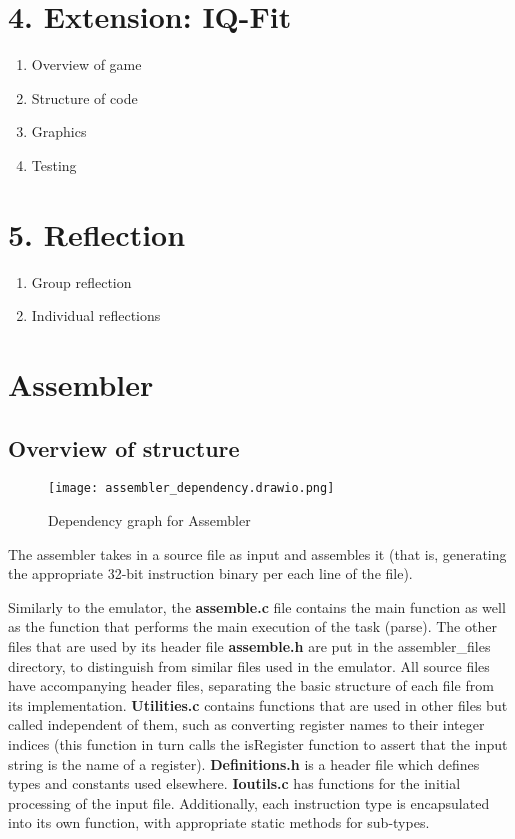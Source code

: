 \documentclass{article}
\begin{document}
\section*{4. Extension: IQ-Fit} 
\begin{enumerate}
    \item Overview of game
    \item Structure of code
    \item Graphics
    \item Testing
\end{enumerate}

\section*{5. Reflection}
\begin{enumerate}
    \item Group reflection
    \item Individual reflections
\end{enumerate}
\clearpage

\section{Assembler}
\vspace{12pt}
\subsection{Overview of structure}

\begin{figure}
    \centering
    \texttt{[image: assembler\_dependency.drawio.png]}
    \caption{Dependency graph for Assembler}
    \label{fig:image}
\end{figure}

The assembler takes in a source file as input and assembles it (that is, generating the appropriate 32-bit instruction binary per each line of the file). 

Similarly to the emulator, the \textbf{assemble.c} file contains the main function as well as the function that performs the main execution of the task (parse). The other files that are used by its header file \textbf{assemble.h} are put in the assembler\_files directory, to distinguish from similar files used in the emulator. All source files have accompanying header files, separating the basic structure of each file from its implementation. \textbf{Utilities.c} contains functions that are used in other files but called independent of them, such as converting register names to their integer indices (this function in turn calls the isRegister function to assert that the input string is the name of a register). \textbf{Definitions.h} is a header file which defines types and constants used elsewhere. \textbf{Ioutils.c} has functions for the initial processing of the input file. Additionally, each instruction type is encapsulated into its own function, with appropriate static methods for sub-types. 
\end{document}
